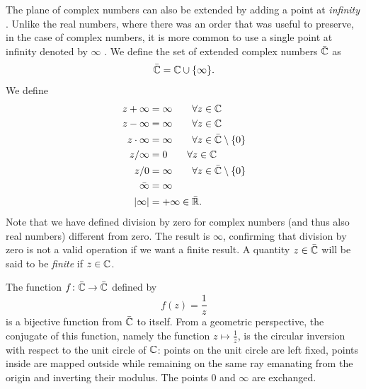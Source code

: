 The plane of complex numbers can also be extended by adding a point at
\emph{infinity}%
%
.
Unlike the real numbers, where there was an order that was useful to preserve,
in the case of complex numbers, it is more common to use a single point at
infinity denoted by \emph{$\infty$}%
\mymargin{$\infty$}%
\index{$\infty$}.
We define the set of extended complex numbers $\bar {{\mathbb C}}$ as
\[
\bar {{\mathbb C}} = {\mathbb C} \cup {\left\{ \infty \right\}}.
\]
We define
\begin{align*}
  z + \infty &= \infty \qquad \forall z \in {\mathbb C}\\
  z - \infty &= \infty \qquad \forall z \in {\mathbb C}\\
   z\cdot \infty &= \infty \qquad \forall z \in \bar{{\mathbb C}}\setminus{\left\{ 0 \right\}} \\
   z / \infty &= 0 \qquad \forall z \in {\mathbb C} \\
   z / 0 &= \infty \qquad \forall z \in \bar {{\mathbb C}} \setminus{\left\{ 0 \right\}}\\
   \bar \infty &= \infty \\
   {\left|\infty\right|} &= +\infty \in \bar {{\mathbb R}}.
\end{align*}
Note that we have defined division by zero for complex numbers
(and thus also real numbers) different from zero. The result is $\infty$,
confirming that division by zero is not a valid operation if we want a finite
result.
A quantity $z\in \bar {{\mathbb C}}$ will be said to be \emph{finite} if $z\in {\mathbb C}$.

\begin{example}
  The function $f\colon \bar {{\mathbb C}} \to \bar {{\mathbb C}}$ 
  defined by 
  \[
  f(z) = \frac{1}{z}
  \]
  is a bijective function from $\bar {{\mathbb C}}$ to itself.
  From a geometric perspective, the conjugate of this function,
  namely the function $z\mapsto \frac 1 {\bar z}$, 
  is the circular inversion with respect to the unit circle of ${\mathbb C}$:
  points on the unit circle are left fixed,
  points inside are mapped outside while remaining on the 
  same ray emanating from the origin and inverting their modulus.
  The points $0$ and $\infty$ are exchanged.
\end{example}


